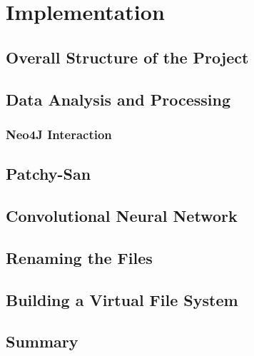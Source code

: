 
    
    \chapter{Implementation}
    
    \section{Overall Structure of the Project}
    
    \section{Data Analysis and Processing}
    
        \subsection{}
        
        \subsection{Neo4J Interaction}
        
        
    \section{Patchy-San}
    
    \subsection{}
    
    \subsection{}
    
    \subsection{}
    
    \subsection{}
    
    \section{Convolutional Neural Network}
    
    \section{Renaming the Files}
    
    \section{Building a Virtual File System}
    
    
    \section{Summary}
